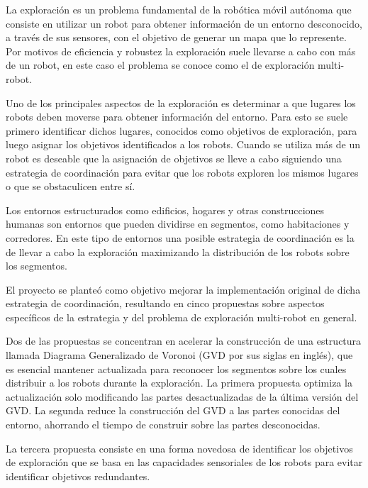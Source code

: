 La exploración es un problema fundamental de la robótica móvil autónoma que
consiste en utilizar un robot para obtener información de un entorno
desconocido, a través de sus sensores, con el objetivo de generar un mapa que lo
represente. Por motivos de eficiencia y robustez la exploración suele llevarse
a cabo con más de un robot, en este caso el problema se conoce como el de
exploración multi-robot.

Uno de los principales aspectos de la exploración es determinar a que lugares
los robots deben moverse para obtener información del entorno. Para esto se
suele primero identificar dichos lugares, conocidos como objetivos de
exploración, para luego asignar los objetivos identificados a los robots.
Cuando se utiliza más de un robot es deseable que la asignación de objetivos se
lleve a cabo siguiendo una estrategia de coordinación para evitar que los
robots exploren los mismos lugares o que se obstaculicen entre sí.

Los entornos estructurados como edificios, hogares y otras construcciones
humanas son entornos que pueden dividirse en segmentos, como habitaciones
y corredores. En este tipo de entornos una posible estrategia de coordinación 
es la de llevar a cabo la exploración maximizando la distribución de los
robots sobre los segmentos. 

 
El proyecto se planteó como objetivo mejorar la implementación original de dicha estrategia de coordinación, resultando en cinco propuestas sobre aspectos específicos de la estrategia y del problema de exploración multi-robot en general.

Dos de las propuestas se concentran en acelerar la construcción de una
estructura llamada Diagrama Generalizado de Voronoi (GVD por sus siglas en
inglés), que es esencial mantener actualizada para reconocer los segmentos
sobre los cuales distribuir a los robots durante la exploración. La primera
propuesta optimiza la actualización solo modificando las partes desactualizadas 
de la última versión del GVD. La segunda reduce la construcción del GVD a las
partes conocidas del entorno, ahorrando el tiempo de construir sobre las
partes desconocidas.

La tercera propuesta consiste en una forma novedosa de identificar los objetivos de exploración
que se basa en las capacidades sensoriales de los robots para evitar
identificar objetivos redundantes.

